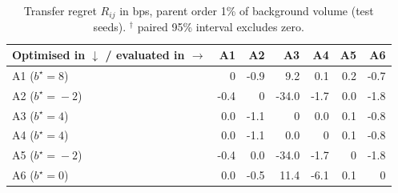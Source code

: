 \begin{table}[H]
\centering\footnotesize
\caption{Transfer regret $R_{ij}$ in bps, parent order 1\% of background volume (test seeds). $^\dagger$ paired 95\% interval excludes zero.}\label{tab:regret1}
\begin{tabular}{lrrrrrr}
\toprule
Optimised in $\downarrow$ / evaluated in $\rightarrow$ & A1 & A2 & A3 & A4 & A5 & A6 \\
\midrule
A1 ($b^\star\!=\!8$) & 0 & -0.9 & 9.2 & 0.1 & 0.2 & -0.7 \\
A2 ($b^\star\!=\!-2$) & -0.4 & 0 & -34.0 & -1.7 & 0.0 & -1.8 \\
A3 ($b^\star\!=\!4$) & 0.0 & -1.1 & 0 & 0.0 & 0.1 & -0.8 \\
A4 ($b^\star\!=\!4$) & 0.0 & -1.1 & 0.0 & 0 & 0.1 & -0.8 \\
A5 ($b^\star\!=\!-2$) & -0.4 & 0.0 & -34.0 & -1.7 & 0 & -1.8 \\
A6 ($b^\star\!=\!0$) & 0.0 & -0.5 & 11.4 & -6.1 & 0.1 & 0 \\
\bottomrule
\end{tabular}
\end{table}
